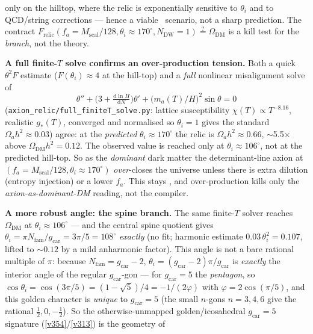 \documentclass[11pt,a4paper]{article}
\newcommand{\Nfam}{N_{\mathrm{fam}}}
\begin{document}
only on the hilltop, where the relic is exponentially sensitive to $\theta_i$ and to QCD/string
corrections --- hence a viable \mC\ scenario, not a sharp prediction. The contract
$F_{\mathrm{relic}}(f_a{=}M_{\mathrm{scal}}/128,\theta_i{\approx}170^\circ,N_{\mathrm{DW}}{=}1)\stackrel{?}{=}\Omega_{\mathrm{DM}}$
is a kill test for the \emph{branch}, not the theory.
\par\smallskip\noindent\textbf{A full finite-$T$ solve confirms an over-production tension.} Both a quick
$\theta^2F$ estimate ($F(\theta_i)\approx4$ at the hill-top) and a \emph{full} nonlinear misalignment solve of
\[
  \theta'' + \bigl(3+\tfrac{\mathrm{d}\ln H}{\mathrm{d}N}\bigr)\theta' + \bigl(m_a(T)/H\bigr)^2\sin\theta=0
\]
(\texttt{axion\_relic/full\_finiteT\_solve.py}: lattice susceptibility $\chi(T)\propto T^{-8.16}$, realistic
$g_*(T)$, converged and normalised so $\theta_i{=}1$ gives the standard $\Omega_a h^2\approx0.03$) agree: at
the \emph{predicted} $\theta_i\approx170^\circ$ the relic is $\Omega_a h^2\approx0.66$, $\sim$5.5$\times$
above $\Omega_{\mathrm{DM}}h^2=0.12$. The observed value is reached only at $\theta_i\approx106^\circ$, not at
the predicted hill-top. So as the \emph{dominant} dark matter the determinant-line axion at
$(f_a{=}M_{\mathrm{scal}}/128,\theta_i{\approx}170^\circ)$ \emph{over}-closes the universe unless there is
extra dilution (entropy injection) or a lower $f_a$. This stays \mC, and over-production kills only the
\emph{axion-as-dominant-DM} reading, not the compiler.
\par\smallskip\noindent\textbf{A more robust angle: the spine branch.}
 The same finite-$T$ solver reaches $\Omega_{\mathrm{DM}}$ at
$\theta_i\approx106^\circ$ --- and the central spine quotient gives $\theta_i=\pi\Nfam/g_{\mathrm{car}}=3\pi/5=108^\circ$
\emph{exactly} (no fit; harmonic estimate $0.03\,\theta_i^2=0.107$, lifted to
${\sim}0.12$ by a mild anharmonic factor).
 This angle is not a bare rational multiple of $\pi$: because
$\Nfam=g_{\mathrm{car}}-2$, $\theta_i=(g_{\mathrm{car}}-2)\pi/g_{\mathrm{car}}$ is \emph{exactly} the interior
angle of the regular $g_{\mathrm{car}}$-gon --- for $g_{\mathrm{car}}=5$ the \emph{pentagon}, so
$\cos\theta_i=\cos(3\pi/5)=(1-\sqrt5)/4=-1/(2\varphi)$ with $\varphi=2\cos(\pi/5)$, and this golden character is
\emph{unique} to $g_{\mathrm{car}}=5$ (the small $n$-gons $n=3,4,6$ give the rational $\tfrac12,0,-\tfrac12$). So the
otherwise-unmapped golden/icosahedral $g_{\mathrm{car}}=5$ signature (\vref{v354}/\vref{v313}) is the geometry of
\end{document}
